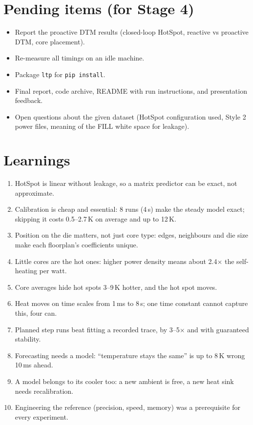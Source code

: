 \documentclass[11pt,a4paper]{article}
\begin{document}
\section{Pending items (for Stage 4)}
\begin{itemize}
  \item Report the proactive DTM results (closed-loop HotSpot, reactive vs proactive DTM, core
        placement).
  \item Re-measure all timings on an idle machine.
  \item Package \texttt{ltp} for \texttt{pip install}.
  \item Final report, code archive, README with run instructions, and presentation feedback.
  \item Open questions about the given dataset (HotSpot configuration used, Style 2 power files,
        meaning of the FILL white space for leakage).
\end{itemize}

\section{Learnings}
\begin{enumerate}
  \item HotSpot is linear without leakage, so a matrix predictor can be exact, not approximate.
  \item Calibration is cheap and essential: 8 runs (4\,s) make the steady model exact; skipping it
        costs 0.5--2.7\,K on average and up to 12\,K.
  \item Position on the die matters, not just core type: edges, neighbours and die size make each
        floorplan's coefficients unique.
  \item Little cores are the hot ones: higher power density means about 2.4$\times$ the
        self-heating per watt.
  \item Core averages hide hot spots 3--9\,K hotter, and the hot spot moves.
  \item Heat moves on time scales from 1\,ms to 8\,s; one time constant cannot capture this, four
        can.
  \item Planned step runs beat fitting a recorded trace, by 3--5$\times$ and with guaranteed
        stability.
  \item Forecasting needs a model: ``temperature stays the same'' is up to 8\,K wrong 10\,ms
        ahead.
  \item A model belongs to its cooler too: a new ambient is free, a new heat sink needs
        recalibration.
  \item Engineering the reference (precision, speed, memory) was a prerequisite for every
        experiment.
\end{enumerate}
\end{document}
